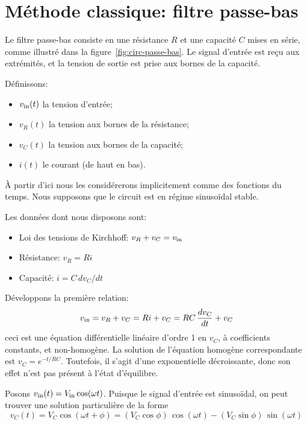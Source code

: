 \section{Méthode classique: filtre passe-bas}

Le filtre passe-bas consiste en une résistance $R$ et une capacité $C$
mises en série,
comme illustré dans la figure~\ref{fig:circ-passe-bas}.
Le signal d'entrée est reçu aux extrémités, et la tension de sortie est prise
aux bornes de la capacité.

Définissons:
\begin{itemize}
    \item $v_{\mathrm{in}}(t)$ la tension d'entrée;
    \item $v_R(t)$ la tension aux bornes de la résistance;
    \item $v_C(t)$ la tension aux bornes de la capacité;
    \item $i(t)$ le courant (de haut en bas).
\end{itemize}

À partir d'ici nous les considérerons implicitement
comme des fonctions du temps.
Nous supposons que le circuit est en régime sinusoïdal stable.

Les données dont nous disposons sont:
\begin{itemize}
    \item Loi des tensions de Kirchhoff: $v_R + v_C = v_{\mathrm{in}}$
    \item Résistance: $v_R = Ri$
    \item Capacité: $i = C\,dv_C/dt$
\end{itemize}

Développons la première relation:
\begin{equation}
    \label{eq:diff-passe-bas}
    v_{\mathrm{in}} = v_R + v_C = Ri + v_C = RC\,\frac{dv_C}{dt} + v_C
\end{equation}
ceci est une équation différentielle linéaire d'ordre 1 en $v_C$,
à coefficients constants, et non-homogène.
La solution de l'équation homogène correspondante est $v_C = e^{-t/RC}$.
Toutefois, il s'agit d'une exponentielle décroissante,
donc son effet n'est pas présent à l'état d'équilibre.

Posons $v_{\mathrm{in}}(t) = V_{\mathrm{in}}\cos(\omega t)$.
Puisque le signal d'entrée est sinusoïdal, on peut trouver une solution
particulière de la forme
\[
    v_C(t) = V_C\cos(\omega t + \phi)
    = (V_C\cos\phi)\,\cos(\omega t) - (V_C\sin\phi)\,\sin(\omega t)
\]

